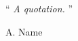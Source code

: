 \vspace*{0.2\textheight}
\begin{flushright}
\noindent\enquote{\itshape
	A quotation.
}
\end{flushright}\bigbreak

\hfill A. Name